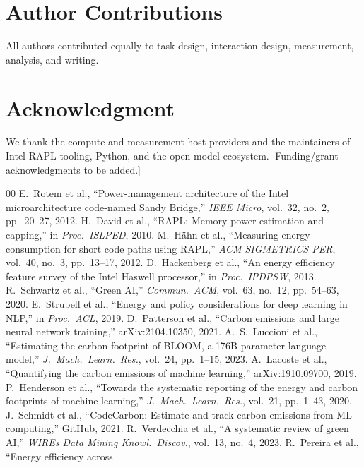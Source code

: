 \documentclass[journal]{IEEEtran}
\begin{document}
\section*{Author Contributions}
All authors contributed equally to task design, interaction design,
measurement, analysis, and writing.

\section*{Acknowledgment}
We thank the compute and measurement host providers and the maintainers of
Intel RAPL tooling, Python, and the open model ecosystem. [Funding/grant
acknowledgments to be added.]

\begin{thebibliography}{00}
 E.~Rotem et al., ``Power-management architecture of the
Intel microarchitecture code-named Sandy Bridge,'' \emph{IEEE Micro},
vol.~32, no.~2, pp.~20--27, 2012.
 H.~David et al., ``RAPL: Memory power estimation and
capping,'' in \emph{Proc.\ ISLPED}, 2010.
 M.~H\"ahn et al., ``Measuring energy consumption for
short code paths using RAPL,'' \emph{ACM SIGMETRICS PER}, vol.~40, no.~3,
pp.~13--17, 2012.
 D.~Hackenberg et al., ``An energy efficiency feature
survey of the Intel Haswell processor,'' in \emph{Proc.\ IPDPSW}, 2013.
 R.~Schwartz et al., ``Green AI,'' \emph{Commun.\ ACM},
vol.~63, no.~12, pp.~54--63, 2020.
 E.~Strubell et al., ``Energy and policy considerations
for deep learning in NLP,'' in \emph{Proc.\ ACL}, 2019.
 D.~Patterson et al., ``Carbon emissions and large
neural network training,'' arXiv:2104.10350, 2021.
 A.~S.~Luccioni et al., ``Estimating the carbon
footprint of BLOOM, a 176B parameter language model,'' \emph{J.\ Mach.\
Learn.\ Res.}, vol.~24, pp.~1--15, 2023.
 A.~Lacoste et al., ``Quantifying the carbon emissions
of machine learning,'' arXiv:1910.09700, 2019.
 P.~Henderson et al., ``Towards the systematic
reporting of the energy and carbon footprints of machine learning,''
\emph{J.\ Mach.\ Learn.\ Res.}, vol.~21, pp.~1--43, 2020.
 J.~Schmidt et al., ``CodeCarbon: Estimate and track
carbon emissions from ML computing,'' GitHub, 2021.
 R.~Verdecchia et al., ``A systematic review of green
AI,'' \emph{WIREs Data Mining Knowl.\ Discov.}, vol.~13, no.~4, 2023.
\bibitem{pereira2017} R.~Pereira et al., ``Energy efficiency across

\end{thebibliography}
\end{document}
